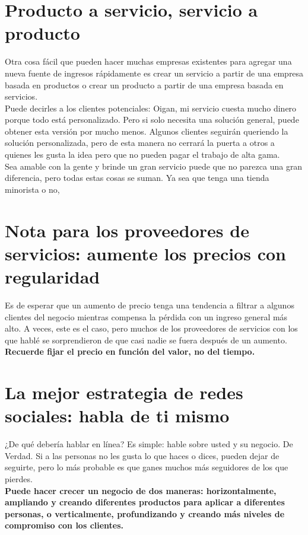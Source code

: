 \documentclass[10pt]{book}
\begin{document}
	\section{Producto a servicio, servicio a producto}
	    Otra cosa fácil que pueden hacer muchas empresas existentes para agregar una nueva fuente de ingresos rápidamente es crear un servicio a partir de una empresa basada en productos o crear un producto a partir de una empresa basada en servicios.\\
	    Puede decirles a los clientes potenciales: Oigan, mi servicio cuesta mucho dinero porque todo está personalizado. Pero si solo necesita una solución general, puede obtener esta versión por mucho menos. Algunos clientes seguirán queriendo la solución personalizada, pero de esta manera no cerrará la puerta a otros a quienes les gusta la idea pero que no pueden pagar el trabajo de alta gama.\\
	    Sea amable con la gente y brinde un gran servicio puede que no parezca una gran diferencia, pero todas estas cosas se suman. Ya sea que tenga una tienda minorista o no,

	\section{Nota para los proveedores de servicios: aumente los precios con regularidad}
	    Es de esperar que un aumento de precio tenga una tendencia a filtrar a algunos clientes del negocio mientras compensa la pérdida con un ingreso general más alto. A veces, este es el caso, pero muchos de los proveedores de servicios con los que hablé se sorprendieron de que casi nadie se fuera después de un aumento.\\
	    \textbf{Recuerde fijar el precio en función del valor, no del tiempo.}

	\section{La mejor estrategia de redes sociales: habla de ti mismo}	
	    ¿De qué debería hablar en línea? Es simple: hable sobre usted y su negocio. De Verdad. Si a las personas no les gusta lo que haces o dices, pueden dejar de seguirte, pero lo más probable es que ganes muchos más seguidores de los que pierdes. \\
	    \textbf{Puede hacer crecer un negocio de dos maneras: horizontalmente, ampliando y creando diferentes productos para aplicar a diferentes personas, o verticalmente, profundizando y creando más niveles de compromiso con los clientes.}
\end{document}
